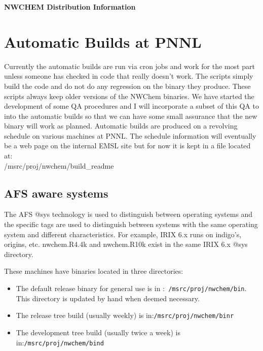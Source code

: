 
\setlength{\parskip}{6pt}



\begin{center}
{\bf\Large NWCHEM Distribution Information}
\end{center}

\section{Automatic Builds at PNNL}
Currently the automatic builds are run via cron jobs and work for the
most part unless someone has checked in code that really doesn't
work. The scripts simply build the code and do not do any regression on
the binary they produce.  These scripts always keep older versions of
the NWChem binaries.  We have started the development of some QA
procedures and I will incorporate a subset of this QA to into the
automatic builds so that we can have some small assurance that the new
binary will work as planned.  Automatic builds are produced on a
revolving schedule on various machines at PNNL.  The schedule
information will eventually be a web page on the internal EMSL site
but for now it is kept in a file located at:\\
/msrc/proj/nwchem/build\_readme

\subsection{AFS aware systems}

The AFS @sys technology is used to distinguish between operating
systems and the specific tags are used to distinguish between systems
with the same operating system and different characteristics.  For
example, IRIX 6.x runs on indigo's, origins, etc.  nwchem.R4.4k and
nwchem.R10k exist in the same IRIX 6.x @sys directory.

These machines have binaries located in three directories:
\begin{itemize}
\item The default release binary for general use is in :{\tt
/msrc/proj/nwchem/bin}.  This directory is updated by hand when deemed
necessary.
\item The release tree build (usually weekly) is in:{\tt /msrc/proj/nwchem/binr}
\item The development tree build (usually twice a week) is in:{\tt /msrc/proj/nwchem/bind}
\end{itemize}

